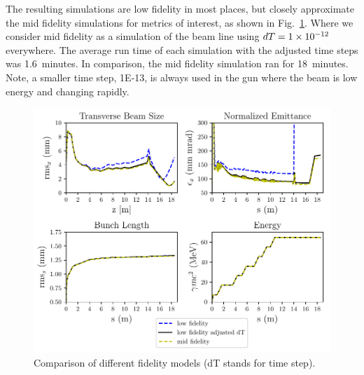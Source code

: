 The resulting simulations are low fidelity in most places, but closely approximate 
the mid fidelity simulations for metrics of interest, as shown in 
Fig.~\ref{tstep}.  Where we consider mid fidelity as a simulation of the 
beam line using $dT=\num{1E-12}$ everywhere. The
average run time of each simulation with the adjusted time steps was 1.6~minutes.
In comparison, the mid fidelity simulation ran for 18~minutes.
Note, a smaller time step, \num{1E-13}, is always used in the gun where the 
beam is low energy and changing rapidly.

\begin{figure}%
	\centering
	\includegraphics[width=\linewidth]{Report/timestep_comparison}
	\caption{Comparison of different fidelity models (dT stands for time step).}
	\label{tstep}
\end{figure}

